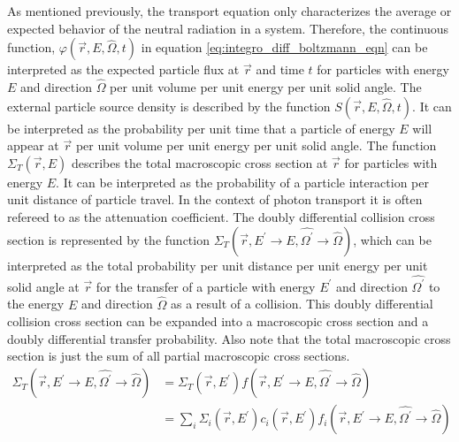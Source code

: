 As mentioned previously, the transport equation only characterizes the average
or expected behavior of the neutral radiation in a system. Therefore, the
continuous function, $\varphi(\vec{r},E,\hat{\Omega},t)$ in equation 
\ref{eq:integro_diff_boltzmann_eqn} can be interpreted as the expected particle 
flux at $\vec{r}$ and time $t$ for particles with energy $E$ and direction
$\hat{\Omega}$ per unit volume per unit energy per unit solid angle. The 
external particle source density is described by the function 
$S(\vec{r},E,\hat{\Omega},t)$. It can be interpreted as the probability per
unit time that a particle of energy $E$ will appear at $\vec{r}$ per unit 
volume per unit energy per unit solid angle. The function $\Sigma_T(\vec{r},E)$ 
describes the total macroscopic cross section at $\vec{r}$ for particles with 
energy $E$. It can be interpreted as the probability of a particle interaction 
per unit distance of particle travel. In the context of photon transport it is 
often refereed to as the attenuation coefficient. The doubly differential 
collision cross section is represented by the function 
$\Sigma_T(\vec{r},E^{'} \to E,\hat{\Omega^{'}} \to \hat{\Omega})$, which can be 
interpreted as the total probability per unit distance per unit energy per unit 
solid angle at $\vec{r}$ for the transfer of a particle with energy $E^{'}$ and 
direction $\hat{\Omega^{'}}$ to the energy $E$ and direction $\hat{\Omega}$ as a
result of a collision. This doubly differential collision cross section can be 
expanded into a macroscopic cross section and a doubly differential transfer 
probability. Also note that the total macroscopic cross section is just the sum 
of all partial macroscopic cross sections.
\begin{align}
  \Sigma_T(\vec{r},E^{'} \to E,\hat{\Omega^{'}} \to \hat{\Omega}) & =
  \Sigma_T(\vec{r},E^{'})
  f(\vec{r},E^{'} \to E,\hat{\Omega^{'}} \to \hat{\Omega}) \\
  & = \sum_i \Sigma_i(\vec{r},E^{'}) c_i(\vec{r},E^{'})
  f_i(\vec{r},E^{'} \to E,\hat{\Omega^{'}} \to \hat{\Omega})
  \label{eq:expanded_diff_collision_cross_sec}
\end{align}

